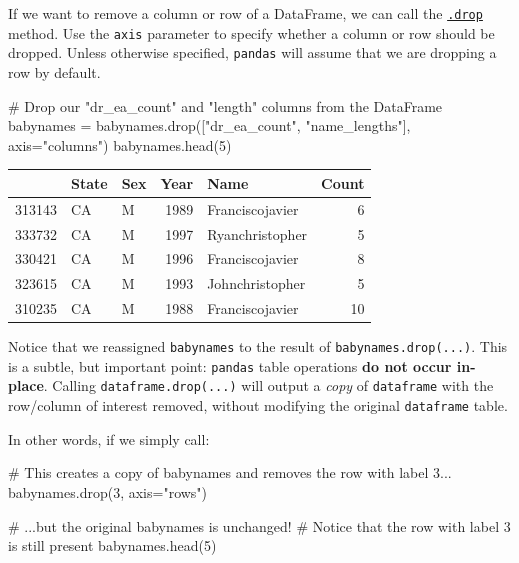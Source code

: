 \documentclass[
  letterpaper,
  DIV=11,
  numbers=noendperiod]{scrreprt}
\newenvironment{Shaded}{\begin{snugshade}}{\end{snugshade}}
\newcommand{\CommentTok}[1]{\textcolor[rgb]{0.37,0.37,0.37}{#1}}
\newcommand{\DecValTok}[1]{\textcolor[rgb]{0.68,0.00,0.00}{#1}}
\newcommand{\NormalTok}[1]{\textcolor[rgb]{0.00,0.23,0.31}{#1}}
\newcommand{\OperatorTok}[1]{\textcolor[rgb]{0.37,0.37,0.37}{#1}}
\newcommand{\StringTok}[1]{\textcolor[rgb]{0.13,0.47,0.30}{#1}}
\begin{document}
If we want to remove a column or row of a DataFrame, we can call the
\href{https://pandas.pydata.org/pandas-docs/stable/reference/api/pandas.DataFrame.drop.html}{\texttt{.drop}}
method. Use the \texttt{axis} parameter to specify whether a column or
row should be dropped. Unless otherwise specified, \texttt{pandas} will
assume that we are dropping a row by default.

\begin{Shaded}
\begin{Highlighting}[]
\CommentTok{\# Drop our "dr\_ea\_count" and "length" columns from the DataFrame}
\NormalTok{babynames }\OperatorTok{=}\NormalTok{ babynames.drop([}\StringTok{"dr\_ea\_count"}\NormalTok{, }\StringTok{"name\_lengths"}\NormalTok{], axis}\OperatorTok{=}\StringTok{"columns"}\NormalTok{)}
\NormalTok{babynames.head(}\DecValTok{5}\NormalTok{)}
\end{Highlighting}
\end{Shaded}

\begin{tabular}{lllrlr}
\toprule
{} & State & Sex &  Year &             Name &  Count \\
\midrule
313143 &    CA &   M &  1989 &  Franciscojavier &      6 \\
333732 &    CA &   M &  1997 &  Ryanchristopher &      5 \\
330421 &    CA &   M &  1996 &  Franciscojavier &      8 \\
323615 &    CA &   M &  1993 &  Johnchristopher &      5 \\
310235 &    CA &   M &  1988 &  Franciscojavier &     10 \\
\bottomrule
\end{tabular}

Notice that we reassigned \texttt{babynames} to the result of
\texttt{babynames.drop(...)}. This is a subtle, but important point:
\texttt{pandas} table operations \textbf{do not occur in-place}. Calling
\texttt{dataframe.drop(...)} will output a \emph{copy} of
\texttt{dataframe} with the row/column of interest removed, without
modifying the original \texttt{dataframe} table.

In other words, if we simply call:

\begin{Shaded}
\begin{Highlighting}[]
\CommentTok{\# This creates a copy of \textasciigrave{}babynames\textasciigrave{} and removes the row with label 3...}
\NormalTok{babynames.drop(}\DecValTok{3}\NormalTok{, axis}\OperatorTok{=}\StringTok{"rows"}\NormalTok{)}

\CommentTok{\# ...but the original \textasciigrave{}babynames\textasciigrave{} is unchanged! }
\CommentTok{\# Notice that the row with label 3 is still present}
\NormalTok{babynames.head(}\DecValTok{5}\NormalTok{)}
\end{Highlighting}
\end{Shaded}
\end{document}
